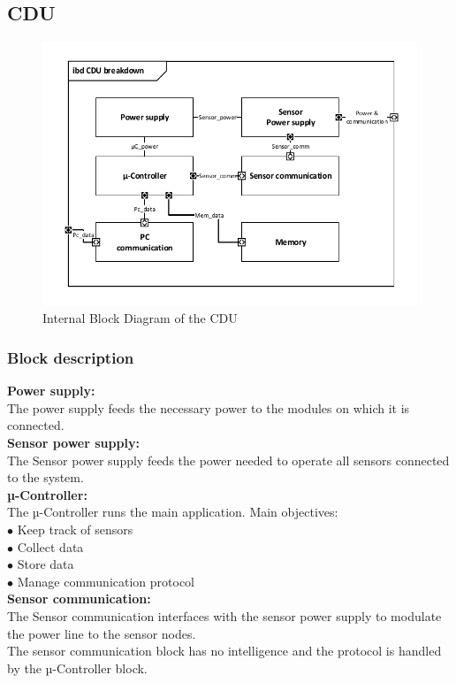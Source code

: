 \subsection{CDU}

\begin{figure}[hbpt]
\centering
\includegraphics[width=.8\textwidth]{billeder/CDU_IBD}
\caption{Internal Block Diagram of the CDU}
\label{CDU_IBD}
\end{figure}

\subsubsection{Block description}

\textbf{Power supply:}\\
The power supply feeds the necessary power to the modules on which it is connected.\\

\textbf{Sensor power supply:}\\
The Sensor power supply feeds the power needed to operate all sensors connected to the system.\\

\textbf{µ-Controller:}\\
The µ-Controller runs the main application. Main objectives:\\
$\bullet$ Keep track of sensors\\
$\bullet$ Collect data\\
$\bullet$ Store data\\
$\bullet$ Manage communication protocol\\

\textbf{Sensor communication:}\\
The Sensor communication interfaces with the sensor power supply to modulate the power line to the sensor nodes.\\
The sensor communication block has no intelligence and the protocol is handled by the µ-Controller block.\\

